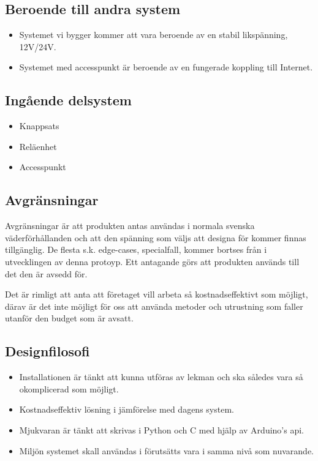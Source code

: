 \documentclass{article}
\begin{document}
\begin{multicols*}{2}
\begin{itemize}
\end{itemize}

\subsection{Beroende till andra system}
\begin{itemize}
    \item Systemet vi bygger kommer att vara beroende av en stabil likspänning, 12V/24V.
    \item Systemet med accesspunkt är beroende av en fungerade koppling till Internet.
\end{itemize}

\subsection{Ingående delsystem}
\begin{itemize}
    \item Knappsats
    \item Reläenhet
    \item Accesspunkt
\end{itemize}

\subsection{Avgränsningar}
 Avgränsningar är att produkten antas användas i normala svenska väderförhållanden och att den spänning som väljs att designa för kommer finnas tillgänglig. De flesta s.k. edge-cases, specialfall, kommer bortses från i utvecklingen av denna protoyp. Ett antagande görs att produkten används till det den är avsedd för. 

Det är rimligt att anta att företaget vill arbeta så kostnadseffektivt som möjligt, därav är det inte möjligt för oss att använda metoder och utrustning som faller utanför den budget som är avsatt. 

\subsection{Designfilosofi}
\begin{itemize}
    \item Installationen är tänkt att kunna utföras av lekman och ska således vara så okomplicerad som möjligt.
    \item Kostnadseffektiv lösning i jämförelse med dagens system.
    \item Mjukvaran är tänkt att skrivas i Python och C med hjälp av Arduino's api.
    \item Miljön systemet skall användas i förutsätts vara i samma nivå som nuvarande.
\end{itemize}


\end{multicols*}
\end{document}
